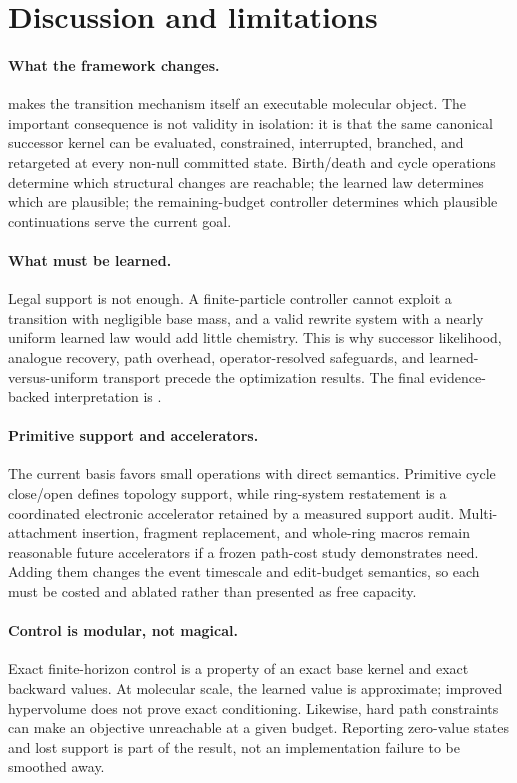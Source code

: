 \section{Discussion and limitations}
\label{sec:discussion}

\paragraph{What the framework changes.}
\method makes the transition mechanism itself an executable molecular object.
The important consequence is not validity in isolation: it is that the same
canonical successor kernel can be evaluated, constrained, interrupted,
branched, and retargeted at every non-null committed state. Birth/death and
cycle operations determine which structural changes are reachable; the learned
law determines which are plausible; the remaining-budget controller determines
which plausible continuations serve the current goal.

\paragraph{What must be learned.}
Legal support is not enough. A finite-particle controller cannot exploit a
transition with negligible base mass, and a valid rewrite system with a nearly
uniform learned law would add little chemistry. This is why successor
likelihood, analogue recovery, path overhead, operator-resolved safeguards, and
learned-versus-uniform transport precede the optimization results. The final
evidence-backed interpretation is
.

\paragraph{Primitive support and accelerators.}
The current basis favors small operations with direct semantics. Primitive
cycle close/open defines topology support, while ring-system restatement is a
coordinated electronic accelerator retained by a measured support audit.
Multi-attachment insertion, fragment replacement, and whole-ring macros remain
reasonable future accelerators if a frozen path-cost study demonstrates need.
Adding them changes the event timescale and edit-budget semantics, so each must
be costed and ablated rather than presented as free capacity.

\paragraph{Control is modular, not magical.}
Exact finite-horizon control is a property of an exact base kernel and exact
backward values. At molecular scale, the learned value is approximate; improved
hypervolume does not prove exact conditioning. Likewise, hard path constraints
can make an objective unreachable at a given budget. Reporting zero-value
states and lost support is part of the result, not an implementation failure to
be smoothed away.


